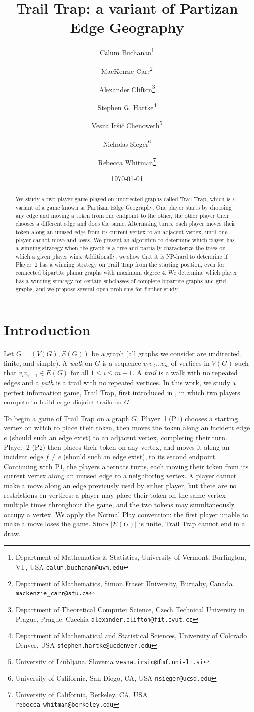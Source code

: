 \documentclass{article}
\title{Trail Trap: a variant of Partizan Edge Geography}
\author{Calum Buchanan\thanks{Department of Mathematics \& Statistics, University of Vermont, Burlington, VT, USA {\tt calum.buchanan@uvm.edu}}\and MacKenzie Carr\thanks{Department of Mathematics, Simon Fraser University, Burnaby, Canada {\tt mackenzie\_carr@sfu.ca}}\and Alexander Clifton\thanks{Department of Theoretical Computer Science, Czech Technical University in Prague, Prague, Czechia {\tt alexander.clifton@fit.cvut.cz}}\and Stephen G. Hartke\thanks{Department of Mathematical and Statistical Sciences, University of Colorado Denver, USA \texttt{stephen.hartke@ucdenver.edu}}\and Vesna Ir\v{s}i\v{c} Chenoweth\thanks{University of Ljubljana, Slovenia \tt vesna.irsic@fmf.uni-lj.si}\and Nicholas Sieger\thanks{University of California, San Diego, CA, USA \tt nsieger@ucsd.edu}\and Rebecca Whitman\thanks{University of California, Berkeley, CA, USA \tt rebecca\_whitman@berkeley.edu}}
\date{\today}
\theoremstyle{plain}
\theoremstyle{definition}
\def\pone{{\rm{P}\ensuremath{1}}}
\def\ptwo{{\rm{P}\ensuremath{2}}}
\begin{document}
\maketitle

\begin{abstract}
    We study a two-player game played on undirected graphs called {\sc Trail Trap}, which is a variant of a game known as {\sc Partizan Edge Geography}. One player starts by choosing any edge and moving a token from one endpoint to the other; the other player then chooses a different edge and does the same. Alternating turns, each player moves their token along an unused edge from its current vertex to an adjacent vertex, until one player cannot move and loses. We present an algorithm to determine which player has a winning strategy when the graph is a tree and partially characterize the trees on which a given player wins. Additionally, we show that it is NP-hard to determine if Player~2 has a winning strategy on {\sc Trail Trap} from the starting position, even for connected bipartite planar graphs with maximum degree $4$. We determine which player has a winning strategy for certain subclasses of complete bipartite graphs and grid graphs, and we propose several open problems for further study. 
\end{abstract}

\section{Introduction}

Let $G = (V(G),E(G))$ be a graph (all graphs we consider are undirected, finite, and simple). A \emph{walk} on $G$ is a sequence $v_1 v_2 \ldots v_{m}$ of vertices in $V(G)$ such that $v_i v_{i+1} \in E(G)$ for all $1 \le i \le m - 1$. A \emph{trail} is a walk with no repeated edges and a \emph{path} is a trail with no repeated vertices. In this work, we study a perfect information game, {\sc Trail Trap}, first introduced in \cite{ArCaDa21}, in which two players compete to build edge-disjoint trails on $G$. 

To begin a game of {\sc Trail Trap} on a graph $G$, Player~1 (\pone{}) chooses a starting vertex on which to place their token, then moves the token along an incident edge $e$ (should such an edge exist) to an adjacent vertex, completing their turn. Player~2 (\ptwo{}) then places their token on any vertex, and moves it along an incident edge $f \not = e$ (should such an edge exist), to its second endpoint. Continuing with \pone{}, the players alternate turns, each moving their token from its current vertex along an unused edge to a neighboring vertex. A player cannot make a move along an edge previously used by either player, but there are no restrictions on vertices: a player may place their token on the same vertex multiple times throughout the game, and the two tokens may simultaneously occupy a vertex. We apply the Normal Play convention: the first player unable to make a move loses the game. Since $|E(G)|$ is finite, {\sc Trail Trap} cannot end in a draw. 
\end{document}

